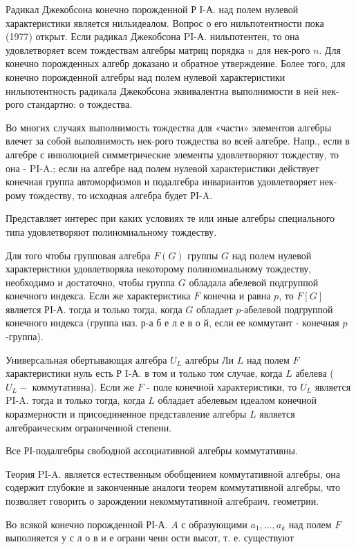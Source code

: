\documentclass[10pt]{article}
\begin{document}
Радикал Джекобсона конечно порожденной Р І-А. над полем нулевой характеристики является нильидеалом. Вопрос о его нильпотентности пока (1977) открыт. Если радикал Джекобсона PI-А. нильпотентен, то она удовлетворяет всем тождествам алгебры матриц порядка $n$ для нек-рого $n$. Для конечно порожденных алгебр доказано и обратное утверждение. Более того, для конечно порожденной алгебры над полем нулевой характеристики нильпотентность радикала Джекобсона эквивалентна выполнимости в ней нек-рого стандартно: о тождества.



Во многих случаях выполнимость тождества для «части» элементов алгебры влечет за собой выполнимость нек-рого тождества во всей алгебре. Напр., если в алгебре с инволюцией симметрические элементы удовлетворяют тождеству, то она - PI-A.; если на алгебре над полем нулевой характеристики действует конечная группа автоморфизмов и подалгебра инвариантов удовлетворяет нек-рому тождеству, то исходная алгебра будет РI-A.



Представляет интерес при каких условиях те или иные алгебры специального типа удовлетворяют полиномиальному тождеству.



Для того чтобы групповая алгебра $F(G)$ группы $G$ над полем нулевой характеристики удовлетворяла некоторому полиномиальному тождеству, необходимо и достаточно, чтобы группа $G$ обладала абелевой подгруппой конечного индекса. Если же характеристика $F$ конечна и равна $p$, то $F[G]$ является РI-А. тогда и только тогда, когда $G$ обладает $p$-абелевой подгруппой конечного индекса (группа наз. $р$-а б е л е в о й, если ее коммутант - конечная $p$-группа).



Универсальная обертывающая алгебра $U_{L}$ алгебры Ли $L$ над полем $F$ характеристики нуль есть Р I-А. в том и только том случае, когда $L$ абелева ( $U_{L}-$ коммутативна). Если же $F$ - поле конечной характеристики, то $U_{L}$ является PI-A. тогда и только тогда, когда $L$ обладает абелевым идеалом конечной коразмерности и присоединенное представление алгебры $L$ является алгебраическим ограниченной степени.



Все РІ-подалгебры свободной ассоциативной алгебры коммутативны.



Теория PI-A. является естественным обобщением коммутативной алгебры, она содержит глубокие и законченные аналоги теорем коммутативной алгебры, что позволяет говорить о зарождении некоммутативной алгебраич. геометрии.



Во всякой конечно порожденной РІ-А. $A$ с образующими $a_{1}, \ldots, a_{k}$ над полем $F$ выполняется у с л о в и е ограни ченн ости высот, т. е. существуют
\end{document}

